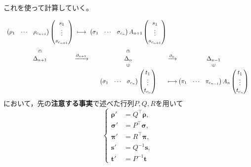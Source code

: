 \documentclass[uplatex]{jsarticle}
\begin{document}
これを使って計算していく。

\begin{equation}
  \begin{array}{c@{\:}c@{\:}c@{\:}c@{\:}c}
    \begin{pmatrix}
      \rho_{1} & \cdots & \rho_{c_{n+1}}
    \end{pmatrix}
    \begin{pmatrix}
      s_{1} \\ \vdots \\ s_{c_{n+1}}
    \end{pmatrix}
    & \longmapsto &
    \begin{pmatrix}
      \sigma_{1} & \cdots & \sigma_{c_{n}}
    \end{pmatrix}
    A_{n+1}
    \begin{pmatrix}
      s_{1} \\ \vdots \\ s_{c_{n+1}}
    \end{pmatrix} \\
    \rotatebox{270}{$\in$} & & \rotatebox{270}{$\in$} \\
    \Delta_{n+1} & \xrightarrow{\partial_{n+1}} & \Delta_{n} & \xrightarrow{\partial_{n}} & \Delta_{n-1} \\
    & & \vin & & \vin \\
    & & \begin{pmatrix}
      \sigma_{1} & \cdots & \sigma_{c_{n}}
    \end{pmatrix}
    \begin{pmatrix}
      t_{1} \\ \vdots \\ t_{c_{n}}
    \end{pmatrix}
    & \longmapsto &
    \begin{pmatrix}
      \pi_{1} & \cdots & \pi_{c_{n-1}}
    \end{pmatrix}
    A_{n}
    \begin{pmatrix}
      t_{1} \\ \vdots \\ t_{c_{n}}
    \end{pmatrix} \\
  \end{array}
\end{equation}
において，先の\textbf{注意する事実}で述べた行列$P,Q,R$を用いて
\begin{equation}
  \left\{ \begin{aligned}
    \bm{\rho}' &= Q^{\top} \bm{\rho}, \\
    \bm{\sigma}' &= P^{\top} \bm{\sigma}, \\
    \bm{\pi}' &= R^{\top} \bm{\pi}, \\
    \bm{s}' &= Q^{-1} \bm{s}, \\
    \bm{t}' &= P^{-1} \bm{t}
  \end{aligned} \right.
\end{equation}
\end{document}
